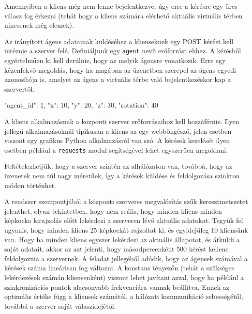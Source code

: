 Amennyiben a kliens még nem lenne bejelentkezve, úgy erre a kérésre egy üres válasz fog érkezni (tehát hogy a kliens számára elérhető aktuális virtuális térben nincsenek még elemek).


Az irányított ágens adatainak küldéséhez a klienseknek egy POST kérést kell intéznie a szerver felé.
Definiáljunk egy \texttt{agent} nevű erőforrást ehhez.
A kérésből egyértelműen ki kell derülnie, hogy az melyik ágensre vonatkozik.
Erre egy kézenfekvő megoldás, hogy ha magában az üzenetben szerepel az ágens egyedi azonosítója is, amelyet az ágens a virtuális térbe való bejelentkezéskor kap a szervertől.


\begin{python}
{
  "agent_id": 1,
  "x": 10, "y": 20, "z": 30,
  "rotation": 40
}
\end{python}


A kliens alkalmazásnak a központi szerver erőforrásaihoz kell hozzáférnie.
Ilyen jellegű alkalmazásoknál tipikusan a kliens az egy webböngésző, jelen esetben viszont egy grafikus Python alkalmazásról van szó.
A kérések kezelését ilyen esetben például a \texttt{requests} modul segítségével lehet egyszerűen megoldani.


Feltételezhetjük, hogy a szerver szintén az alhálózaton van, továbbá, hogy az üzenetek nem túl nagy méretűek, így a kérések küldése és feldolgozása szinkron módon történhet.


A rendszer szempontjából a központi szerveres megvalósítás szűk keresztmetszetet jelenthet, olyan tekintetben, hogy nem reális, hogy minden kliens minden képkocka kirajzolás előtt lekérdezi a szerveren lévő aktuális adatokat.
Tegyük fel ugyanis, hogy minden kliens 25 képkockát rajzoltat ki, és egyidejűleg 10 kliensünk van.
Hogy ha minden kliens egyszer lekérdezi az aktuális állapotot, és átküldi a saját adatait, akkor az azt jelenti, hogy másodpercenként 500 kérést kellene feldolgoznia a szervernek.
A feladat jellegéből adódik, hogy az ágensek számával a kérések száma lineárisan fog változni.
A konstans tényezőn (tehát a szükséges lekérdezések számán kliensenként) viszont lehet javítani azzal, hogy ha például a szinkronizációs pontok alacsonyabb frekvenciára vannak beállítva.
Ennek az optimális értéke függ a kliensek számától, a hálózati kommunikáció sebességétől, továbbá a szerver saját válaszidejétől.


